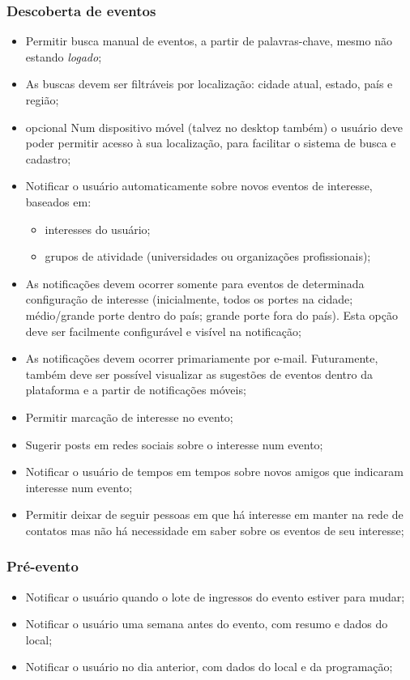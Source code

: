 \documentclass[12pt,a4paper,twoside,hyphens,english,brazil]{abntex2}
\begin{document}
\subsubsection*{Descoberta de eventos}
\begin{itemize}
	\item Permitir busca manual de eventos, a partir de palavras-chave, mesmo não estando \textit{logado};
	\item As buscas devem ser filtráveis por localização: cidade atual, estado, país e região;
	\item {opcional} Num dispositivo móvel (talvez no desktop também) o usuário deve poder permitir acesso à sua localização, para facilitar o sistema de busca e cadastro;
	\item Notificar o usuário automaticamente sobre novos eventos de interesse, baseados em:
		\begin{itemize}
			\item interesses do usuário;
			\item grupos de atividade (universidades ou organizações profissionais);
		\end{itemize}
	\item As notificações devem ocorrer somente para eventos de determinada configuração de interesse (inicialmente, todos os portes na cidade; médio/grande porte dentro do país; grande porte fora do país). Esta opção deve ser facilmente configurável e visível na notificação;
	\item As notificações devem ocorrer primariamente por e-mail. Futuramente, também deve ser possível visualizar as sugestões de eventos dentro da plataforma e a partir de notificações móveis;
	\item Permitir marcação de interesse no evento;
	\item Sugerir posts em redes sociais sobre o interesse num evento;
	\item Notificar o usuário de tempos em tempos sobre novos amigos que indicaram interesse num evento;
	\item Permitir deixar de seguir pessoas em que há interesse em manter na rede de contatos mas não há necessidade em saber sobre os eventos de seu interesse;
\end{itemize}

\subsubsection*{Pré-evento}
\begin{itemize}
	\item Notificar o usuário quando o lote de ingressos do evento estiver para mudar;
	\item Notificar o usuário uma semana antes do evento, com resumo e dados do local;
	\item Notificar o usuário no dia anterior, com dados do local e da programação;
\end{itemize}
\end{document}
